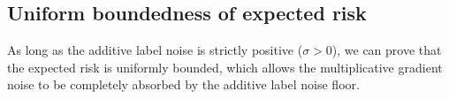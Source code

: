 \documentclass[11pt]{article}
\newcommand{\nesterov}{\mathrm{nesterov}}
\begin{document}


\subsection{Uniform boundedness of expected risk}
\label{app:nes_uniform_boundedness}

As long as the additive label noise is strictly positive ($\sigma > 0$), we can prove that the expected risk is uniformly bounded, which allows the multiplicative gradient noise to be completely absorbed by the additive label noise floor.
\end{document}
